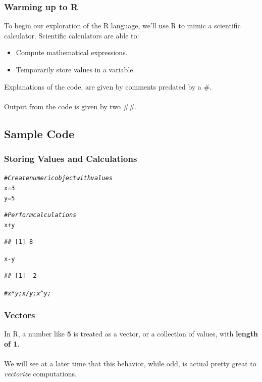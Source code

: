 \documentclass{beamer}\usepackage[]{graphicx}\usepackage[]{color}
\makeatletter
\newcommand{\hlnum}[1]{\textcolor[rgb]{0.686,0.059,0.569}{#1}}%
\newcommand{\hlcom}[1]{\textcolor[rgb]{0.678,0.584,0.686}{\textit{#1}}}%
\newcommand{\hlopt}[1]{\textcolor[rgb]{0,0,0}{#1}}%
\newcommand{\hlstd}[1]{\textcolor[rgb]{0.345,0.345,0.345}{#1}}%
\newcommand{\hlkwb}[1]{\textcolor[rgb]{0.69,0.353,0.396}{#1}}%
\newenvironment{kframe}{%
 \def\at@end@of@kframe{}%
 \ifinner\ifhmode%
  \def\at@end@of@kframe{\end{minipage}}%
  \begin{minipage}{\columnwidth}%
 \fi\fi%
 \def\FrameCommand##1{\hskip\@totalleftmargin \hskip-\fboxsep
 \colorbox{shadecolor}{##1}\hskip-\fboxsep
     \hskip-\linewidth \hskip-\@totalleftmargin \hskip\columnwidth}%
 \MakeFramed {\advance\hsize-\width
   \@totalleftmargin\z@ \linewidth\hsize
   \@setminipage}}%
 {\par\unskip\endMakeFramed%
 \at@end@of@kframe}
\newenvironment{knitrout}{}{} %
\makeatother
\begin{document}
\begin{frame}[fragile]
\frametitle{Warming up to R}

To begin our exploration of the R language, we'll use R to mimic a scientific calculator. Scientific calculators are able to:

\begin{itemize}
\item Compute mathematical expressions.
\item Temporarily store values in a variable.
\end{itemize}

Explanations of the code, are given by comments predated by a  \#.
\\$ $\\
Output from the code is given by two \#\#. 
\end{frame}

\subsection{Sample Code}
\begin{frame}[fragile]
\frametitle{Storing Values and Calculations}
\begin{knitrout}
\color{fgcolor}\begin{kframe}
\begin{alltt}
\hlcom{# Create numeric object with values}
\hlstd{x} \hlkwb{=} \hlnum{3}
\hlstd{y} \hlkwb{=} \hlnum{5}

\hlcom{# Perform calculations}
\hlstd{x} \hlopt{+} \hlstd{y}
\end{alltt}
\begin{verbatim}
## [1] 8
\end{verbatim}
\begin{alltt}
\hlstd{x} \hlopt{-} \hlstd{y}
\end{alltt}
\begin{verbatim}
## [1] -2
\end{verbatim}
\begin{alltt}
\hlcom{# x*y; x/y; x^y;}
\end{alltt}
\end{kframe}
\end{knitrout}
\end{frame}

\begin{frame}[fragile]
\frametitle{Vectors}

In R, a number like \textbf{5} is treated as a vector, or a collection of values, with \textbf{length of 1}. 
\\$ $\\
We will see at a later time that this behavior, while odd, is actual pretty great to \emph{vectorize} computations.
\end{frame}
\end{document}
